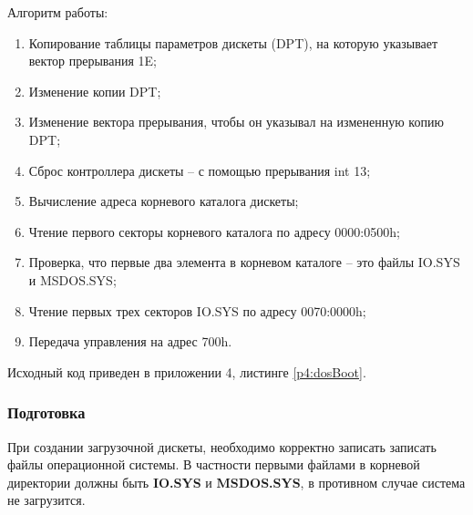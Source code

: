 Алгоритм работы:
\begin{enumerate}
\item Копирование таблицы параметров дискеты (DPT), на которую указывает вектор прерывания 1E;
\item Изменение копии DPT;
\item Изменение вектора прерывания, чтобы он указывал на измененную копию DPT;
\item Сброс контроллера дискеты – с помощью прерывания int 13;
\item Вычисление адреса корневого каталога дискеты;
\item Чтение первого секторы корневого каталога по адресу 0000:0500h;
\item Проверка, что первые два элемента в корневом каталоге – это файлы IO.SYS и MSDOS.SYS;
\item Чтение первых трех секторов IO.SYS по адресу 0070:0000h;
\item Передача управления на адрес 700h.
\end{enumerate}

Исходный код приведен в приложении 4, листинге \ref{p4:dosBoot}.

\subsubsection{Подготовка}
При создании загрузочной дискеты, необходимо корректно записать записать файлы операционной системы. В частности первыми файлами в корневой директории должны быть \textbf{IO.SYS} и \textbf{MSDOS.SYS}, в противном случае система не загрузится.

